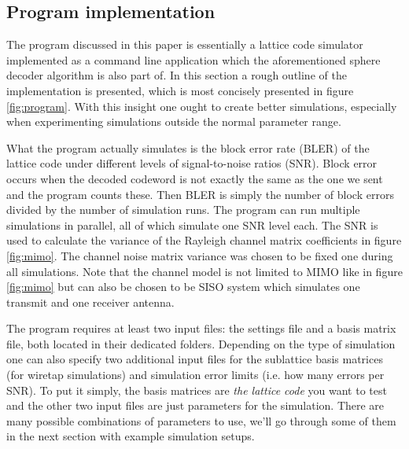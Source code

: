 \documentclass[english,12pt,a4paper,pdftex,sci,utf8]{aaltothesis}
\begin{document}
\subsection{Program implementation}
The program discussed in this paper is essentially a lattice code simulator implemented as a command line application which the aforementioned sphere decoder algorithm is also part of. In this section a rough outline of the implementation is presented, which is most concisely presented in figure \ref{fig:program}. With this insight one ought to create better simulations, especially when experimenting simulations outside the normal parameter range.
\par What the program actually simulates is the block error rate (BLER) of the lattice code under different levels of signal-to-noise ratios (SNR). Block error occurs when the decoded codeword is not exactly the same as the one we sent and the program counts these. Then BLER is simply the number of block errors divided by the number of simulation runs. The program can run multiple simulations in parallel, all of which simulate one SNR level each. The SNR is used to calculate the variance of the Rayleigh channel matrix coefficients in figure \ref{fig:mimo}. The channel noise matrix variance was chosen to be fixed one during all simulations. Note that the channel model is not limited to MIMO like in figure \ref{fig:mimo} but can also be chosen to be SISO system which simulates one transmit and one receiver antenna.
\par The program requires at least two input files: the settings file and a basis matrix file, both located in their dedicated folders. Depending on the type of simulation one can also specify two additional input files for the sublattice basis matrices (for wiretap simulations) and simulation error limits (i.e. how many errors per SNR). To put it simply, the basis matrices are \textit{the lattice code} you want to test and the other two input files are just parameters for the simulation. There are many possible combinations of parameters to use, we'll go through some of them in the next section with example simulation setups.
\end{document}
